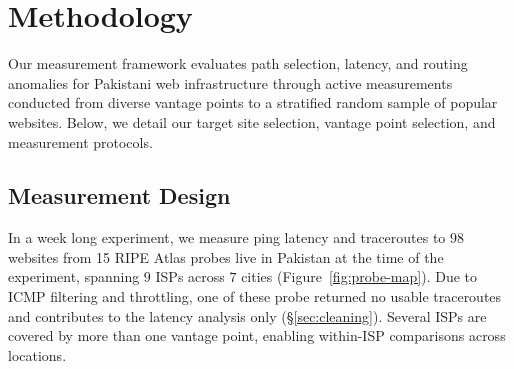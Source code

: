 \documentclass[sigconf,anonymous,10pt]{acmart}
\begin{document}
\section{Methodology}
\label{sec:methodology}
Our measurement framework evaluates path selection, latency, and routing anomalies for Pakistani web infrastructure through active measurements conducted from diverse vantage points to a stratified random sample of popular websites. 
Below, we detail our target site selection, vantage point selection, and measurement protocols.





\subsection{Measurement Design}
\label{sec:measurement}
In a week long experiment, we measure ping latency and traceroutes to $98$ websites from 15 RIPE Atlas probes live in Pakistan at the time of the experiment, spanning $9$ ISPs across $7$ cities (Figure~\ref{fig:probe-map}). Due to ICMP filtering and throttling, one of these probe returned no usable traceroutes and contributes to the latency analysis only (\S\ref{sec:cleaning}). Several ISPs are covered by more than one vantage point, enabling within-ISP comparisons across locations.
\end{document}
